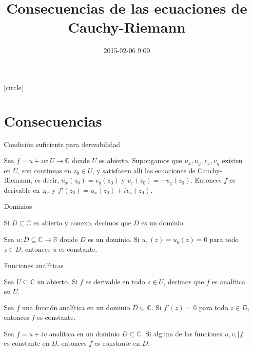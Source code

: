 \documentclass[spanish,presentation]{beamer}
\date{2015-02-06 9:00}
\title{Consecuencias de las ecuaciones de Cauchy-Riemann}
\begin{document}
\maketitle
{}
[circle]

\tableofcontents

\section{Consecuencias}
\label{sec-1}

\begin{frame}[label=sec-1-1]{Condición suficiente para derivabilidad}
\begin{theorem}
Sea \(f=u+iv\colon U\to \mathbb{C}\) donde \(U\) es
abierto. Supongamos que \(u_{x},u_{y},v_{x},v_{y}\) existen en
\(U\), son continuas en \(z_{0}\in U\), y satisfacen allí las
ecuaciones de Cauchy-Riemann, es decir,
\(u_{x}(z_{0})=v_{y}(z_{0})\) y
\(v_{x}(z_{0})=-u_{y}(z_{0})\). Entonces \(f\) es derivable en
\(z_{0}\), y \(f'(z_{0})=u_{x}(z_{0})+iv_{x}(z_{0})\).
\end{theorem}
\end{frame}

\begin{frame}[label=sec-1-2]{Dominios}
\begin{definition}
Si \(D\subseteq \mathbb{C}\) es abierto y conexo, decimos que
\(D\) es un \alert{dominio}.
\end{definition}

\begin{lemma}
Sea \(u\colon D\subseteq \mathbb{C}\to \mathbb{R}\) donde \(D\) es
un dominio. Si \(u_{x}(z)=u_{y}(z)=0\) para todo \(z\in D\),
entonces \(u\) es constante.
\end{lemma}
\end{frame}

\begin{frame}[label=sec-1-3]{Funciones analíticas}
\begin{definition}
Sea \(U\subseteq \mathbb{C}\) un abierto. Si \(f\) es derivable en
todo \(z\in U\), decimos que \(f\) es \alert{analítica} en \(U\).
\end{definition}

\begin{theorem}
Sea \(f\) una función analítica en un dominio \(D\subseteq
    \mathbb{C}\). Si \(f'(z)=0\) para todo \(z\in D\), entonces \(f\)
es constante.
\end{theorem}

\begin{theorem}
Sea \(f=u+iv\) analítica en un dominio \(D\subseteq
    \mathbb{C}\). Si alguna de las funciones \(u,v,|f|\) es constante
en \(D\), entonces \(f\) es constante en \(D\).
\end{theorem}
\end{frame}
\end{document}
